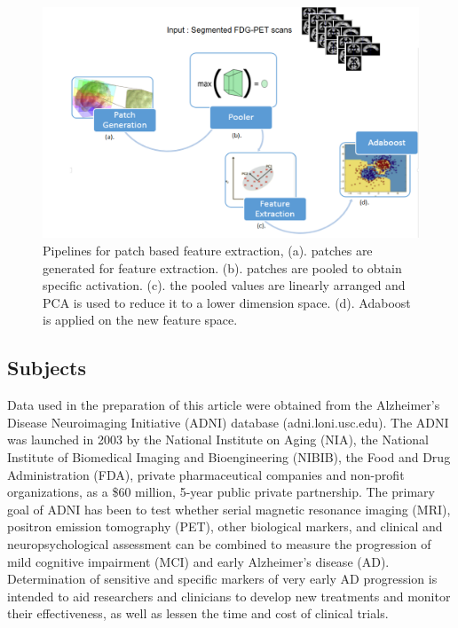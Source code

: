 \documentclass[authoryear,preprint,revi	ew,12pt]{elsarticle}
\begin{document}
\begin{figure}
	\centering
	\includegraphics[width=\linewidth]{figures/pipeline2.png}
	\caption[Pipelines for Patch based Feature Extraction]{Pipelines for patch based feature extraction, (a). patches are generated for feature extraction. (b). patches are pooled to obtain specific activation. (c). the pooled values are linearly arranged and PCA is used to reduce it to a lower dimension space. (d). Adaboost is applied on the new feature space.}
	\label{fig:pipeline}
\end{figure}

\subsection{Subjects}
\label{sec:subjects}
Data used in the preparation of this article were obtained from the Alzheimer\textquoteright s Disease Neuroimaging Initiative (ADNI) database (adni.loni.usc.edu). The ADNI was launched in 2003 by the National Institute on Aging (NIA), the National Institute of Biomedical Imaging and Bioengineering (NIBIB), the Food and Drug Administration (FDA), private pharmaceutical companies and non-profit organizations, as a \$60 million, 5-year public private partnership. The primary goal of ADNI has been to test whether serial magnetic resonance imaging (MRI), positron emission tomography (PET), other biological markers, and clinical and neuropsychological assessment can be combined to measure the progression of mild cognitive impairment (MCI) and early Alzheimer\textquoteright s disease (AD). Determination of sensitive and specific markers of very early AD progression is intended to aid researchers and clinicians to develop new treatments and monitor their effectiveness, as well as lessen the time and cost of clinical trials.
\end{document}
